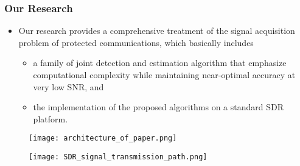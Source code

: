 \begin{frame}
    \frametitle{Our Research}
    \begin{itemize}
        \item Our research provides a comprehensive treatment of the signal acquisition problem of protected communications, which basically includes
        \begin{itemize}
            \item a family of joint detection and estimation algorithm that emphasize computational complexity while maintaining near-optimal accuracy at very low SNR, and
            \item the implementation of the proposed algorithms on a standard SDR platform.
        \end{itemize} 
    \end{itemize}

    \begin{figure}
        \centering
        \begin{minipage}{.5\textwidth}
          \centering
          \texttt{[image: architecture\_of\_paper.png]}
        \end{minipage}%
        \begin{minipage}{.5\textwidth}
          \centering
          \texttt{[image: SDR\_signal\_transmission\_path.png]}
        \end{minipage}
    \end{figure}

\end{frame}


